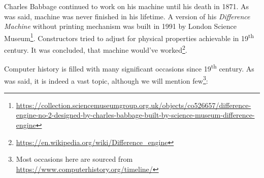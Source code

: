 \documentclass{article}
\begin{document}
            Charles Babbage continued to work on his machine until his death in 1871. As was said, machine was never finished in his lifetime.
            A version of his \emph{Difference Machine} without printing mechanism was built in 1991 by
            London Science Museum\footnote{\href{https://collection.sciencemuseumgroup.org.uk/objects/co526657/difference-engine-no-2-designed-by-charles-babbage-built-by-science-museum-difference-engine}
            {https://collection.sciencemuseumgroup.org.uk/objects/co526657/difference-engine-no-2-designed-by-charles-babbage-built-by-science-museum-difference-engine}}. 
            Constructors tried to adjust for physical properties achievable in 19\textsuperscript{th} century. It was concluded, that machine would've worked\footnote{\href{https://en.wikipedia.org/wiki/Difference_engine}
            {https://en.wikipedia.org/wiki/Difference\_engine}}. \par

            
            Computer history is filled with many significant occasions since 19\textsuperscript{th} century. As was said, it is indeed a vast topic, although we will 
            mention few\footnote{Most occasions here are sourced from \href{https://www.computerhistory.org/timeline/}{https://www.computerhistory.org/timeline/}}:
\end{document}
